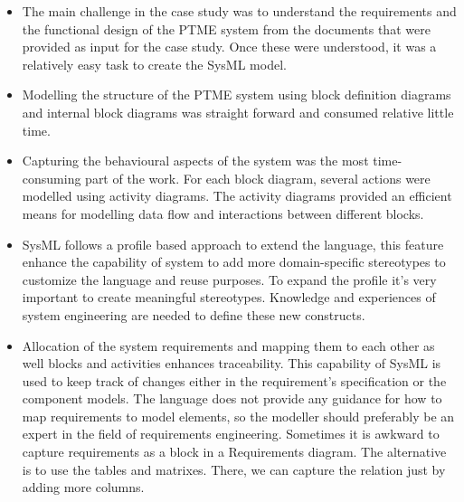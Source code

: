\documentclass[a4paper,12pt,twoside]{report}
\begin{document}
			\begin{itemize}
				\item The main challenge in the case study was to understand the requirements and the functional design of the PTME system from the documents that were provided as input for the case study. Once these were understood, it was a relatively easy task to create the SysML model. \cite{SMSpacecraft}
				\item Modelling the structure of the PTME system using block definition diagrams and internal block diagrams was straight forward and consumed relative little time. \cite{SMSpacecraft}
				\item Capturing the behavioural aspects of the system was the most time-consuming part of the work. For each block diagram, several actions were modelled using activity diagrams. The activity diagrams provided an efficient means for modelling data flow and interactions between different blocks.  \cite{SMSpacecraft}
				\item  SysML follows a profile based approach to extend the language, this feature enhance the capability of system to add more domain-specific stereotypes to customize the language and reuse purposes. To expand the profile it’s very important to create meaningful stereotypes. Knowledge and experiences of system engineering are needed to define these new constructs. \cite{SMSpacecraft}
				\item Allocation of the system requirements and mapping them to each other as well blocks and activities enhances traceability. This capability of SysML is used to keep track of changes either in the requirement’s specification or the component models. The language does not provide any guidance for how to map requirements to model elements, so the modeller should preferably be an expert in the field of requirements engineering. Sometimes it is awkward to capture requirements as a block in a Requirements diagram. The alternative is to use the tables and matrixes. There, we can capture the relation just by adding more columns. \cite{SMSpacecraft}

\end{itemize}
\end{document}
